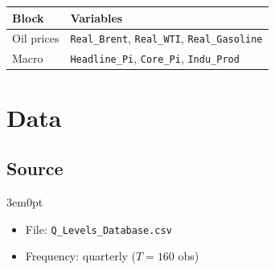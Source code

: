 \documentclass[12pt]{article}
\newenvironment{bodyL2}{\begin{adjustwidth}{3em}{0pt}}{\end{adjustwidth}}
\begin{document}
\begin{enumerate}[label=(\roman*), leftmargin=*]
\begin{center}
\renewcommand{\arraystretch}{1.15}
\begin{tabular}{ll}
\toprule
Block      & Variables \\
\midrule
Oil prices & \texttt{Real\_Brent}, \texttt{Real\_WTI}, \texttt{Real\_Gasoline} \\
Macro      & \texttt{Headline\_Pi}, \texttt{Core\_Pi}, \texttt{Indu\_Prod} \\
\bottomrule
\end{tabular}
\end{center}

\end{enumerate}

\section{Data}

\subsection{Source}
\begin{bodyL2}
\begin{itemize}[label=$\bullet$, leftmargin=*]
    \item File: \texttt{Q\_Levels\_Database.csv}
    \item Frequency: quarterly ($T = 160$ obs)
\end{itemize}
\end{bodyL2}
\end{document}
